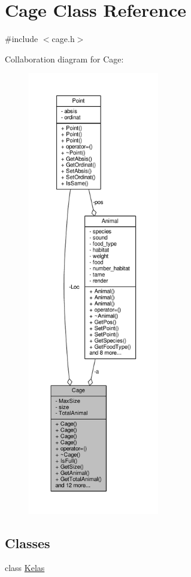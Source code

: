 \hypertarget{classCage}{}\section{Cage Class Reference}
\label{classCage}


{\ttfamily \#include $<$cage.\+h$>$}



Collaboration diagram for Cage\+:
\nopagebreak
\begin{figure}[H]
\begin{center}
\leavevmode
\includegraphics[height=550pt]{classCage__coll__graph}
\end{center}
\end{figure}
\subsection*{Classes}
\begin{DoxyCompactItemize}
\item 
class \hyperlink{classCage_1_1Kelas}{Kelas}
\end{DoxyCompactItemize}
